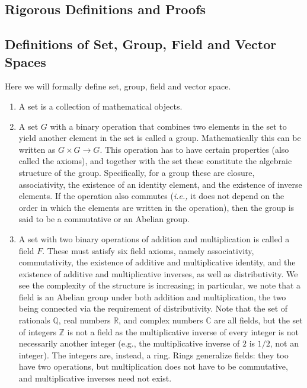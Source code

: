 \documentclass[a4paper,12pt]{report}
\begin{document}
\begin{appendices}
\chapter{Rigorous Definitions and Proofs}

\section{Definitions of Set, Group, Field and Vector Spaces}

Here we will formally define set, group, field and vector space.

\begin{enumerate}
\item  A set is a collection of mathematical objects.

\item  A set \( G \) with a binary operation that combines two elements in the set to yield another element in the set is called a group. Mathematically this can be written as \( G \times G \to G \). This operation has to have certain properties (also called the axioms), and together with the set these constitute the algebraic structure of the group. Specifically, for a group these are closure, associativity, the existence of an identity element, and the existence of inverse elements. If the operation also commutes (\textit{i.e.,}  it does not depend on the order in which the elements are written in the operation), then the group is said to be a commutative or an Abelian group.

\item  A set with two binary operations of addition and multiplication is called a field \( F \). These must satisfy six field axioms, namely associativity, commutativity, the existence of additive and multiplicative identity, and the existence of additive and multiplicative inverses, as well as distributivity. We see the complexity of the structure is increasing; in particular, we note that a field is an Abelian group under both addition and multiplication, the two being connected via the requirement of distributivity. Note that the set of rationals \( \mathbb{Q} \), real numbers \( \mathbb{R} \), and complex numbers \( \mathbb{C} \) are all fields, but the set of integers \( \mathbb{Z} \) is not a field as the multiplicative inverse of every integer is not necessarily another integer (e.g., the multiplicative inverse of \( 2 \) is \( 1/2 \), not an integer). The integers are, instead, a ring. Rings generalize fields: they too have two operations, but multiplication does not have to be commutative, and multiplicative inverses need not exist.


\end{enumerate}
\end{appendices}
\end{document}
